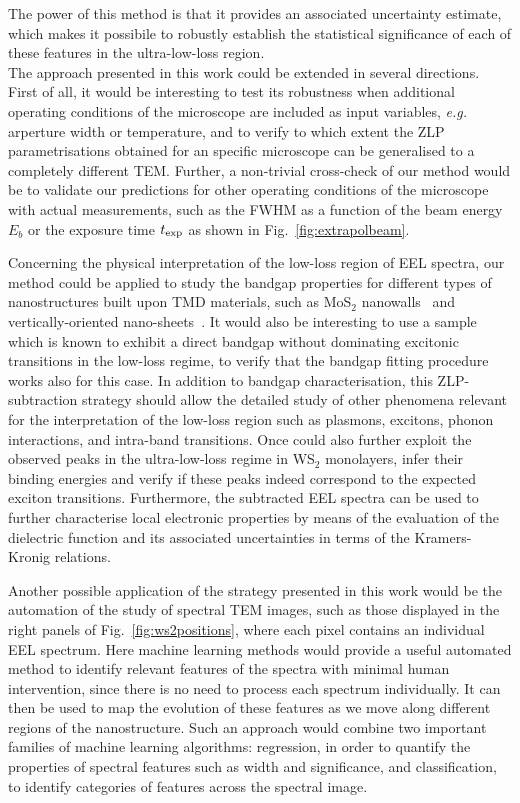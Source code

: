 The power of this method is that it provides an associated uncertainty estimate,
which makes it possibile to robustly establish the statistical significance
of each of these features in the ultra-low-loss region.\\

The approach presented in this work could be extended
in several directions.
%
First of all, it would be interesting to test its robustness when additional
operating conditions of the microscope are included as input variables,
{\it e.g.} arperture width or temperature,
and to verify to which extent the ZLP parametrisations obtained for an specific microscope
can be generalised to a completely different TEM.
%
Further, a non-trivial cross-check of our method would be to validate
our predictions for other operating conditions of the microscope with actual measurements, such
as the FWHM as a function of the beam energy $E_b$ or the exposure time
$t_{\rm exp}$ as shown in Fig.~\ref{fig:extrapolbeam}.

Concerning the physical interpretation of the low-loss region of EEL
spectra, our method could be applied to study the bandgap properties 
for different types
of nanostructures built upon TMD materials, such as MoS$_2$ nanowalls~\cite{nanowalls}
and vertically-oriented nano-sheets~\cite{Bolhuis:2020}.
%
It would also be interesting to use a sample which is known to exhibit
a direct bandgap without dominating excitonic transitions in the low-loss regime, 
to verify that the bandgap fitting procedure works 
also for this case.
%
In addition to bandgap characterisation, this ZLP-subtraction
strategy should allow the detailed study
of other phenomena relevant for the interpretation of the low-loss
region such as plasmons, excitons, phonon interactions, and
intra-band transitions.
%
Once could also further exploit the observed peaks in the ultra-low-loss
regime in WS$_2$ monolayers, infer their binding energies
and verify if these peaks indeed correspond to the expected
exciton transitions.
%
Furthermore, the subtracted EEL spectra can be used to further characterise
local electronic properties by means of the
evaluation of the dielectric function and its associated
uncertainties in terms of the Kramers-Kronig relations.

Another possible application of the strategy presented in this work would be the automation of
the study of spectral TEM images,
such as those displayed in the right panels of Fig.~\ref{fig:ws2positions},
where each pixel contains an individual EEL spectrum.
%
Here machine learning methods would provide a useful automated method
to identify relevant features of the spectra with minimal
human intervention, since there is no need to process each spectrum individually.
%
It can then be used to map
the evolution of these features as we move along different regions of the
nanostructure.
%
Such an approach would combine two important families of machine learning algorithms: 
regression, in order to quantify the properties of spectral
features such as width and significance, and classification, to identify categories
of features across the spectral image.

